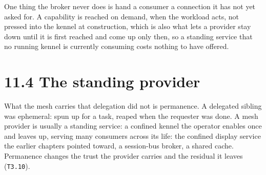 One thing the broker never does is hand a consumer a connection it has
not yet asked for. A capability is reached on demand, when the workload
acts, not pressed into the kennel at construction, which is also what
lets a provider stay down until it is first reached and come up only
then, so a standing service that no running kennel is currently
consuming costs nothing to have offered.

\hypertarget{the-standing-provider}{%
\section{11.4 The standing provider}\label{the-standing-provider}}

What the mesh carries that delegation did not is permanence. A delegated
sibling was ephemeral: spun up for a task, reaped when the requester was
done. A mesh provider is usually a standing service: a confined kennel
the operator enables once and leaves up, serving many consumers across
its life: the confined display service the earlier chapters pointed
toward, a session-bus broker, a shared cache. Permanence changes the
trust the provider carries and the residual it leaves (\texttt{T3.10}).

